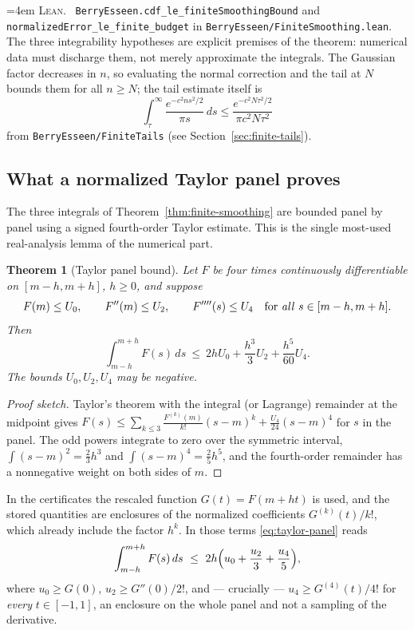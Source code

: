 \documentclass[10pt,a4paper]{article}
\theoremstyle{plain}
\newtheorem{theorem}{Theorem}[section]
\theoremstyle{definition}
\newcommand{\lean}[1]{\texttt{#1}}
\newcommand{\file}[1]{\texttt{#1}}
\newenvironment{leanref}%
  {\par\addvspace{3pt}\begingroup\sloppy\emergencystretch=4em
   \noindent\footnotesize\textsc{Lean.}\ \ignorespaces}%
  {\par\endgroup\addvspace{3pt}}
\begin{document}
\begin{leanref}
\lean{BerryEsseen.cdf\_le\_finiteSmoothingBound} and
\lean{normalizedError\_le\_finite\_budget} in
\file{BerryEsseen/FiniteSmoothing.lean}. The three integrability hypotheses are
explicit premises of the theorem: numerical data must discharge them, not merely
approximate the integrals. The Gaussian factor decreases in $n$, so evaluating
the normal correction and the tail at $N$ bounds them for all $n\ge N$; the
tail estimate itself is
\[
  \int_\tau^\infty\frac{e^{-c^2ns^2/2}}{\pi s}\,ds
  \le \frac{e^{-c^2N\tau^2/2}}{\pi c^2N\tau^2}
\]
from \file{BerryEsseen/FiniteTails} (see Section~\ref{sec:finite-tails}).
\end{leanref}

\subsection{What a normalized Taylor panel proves}
\label{sec:taylor-panel}

The three integrals of Theorem~\ref{thm:finite-smoothing} are bounded panel by
panel using a signed fourth-order Taylor estimate. This is the single most-used
real-analysis lemma of the numerical part.

\begin{theorem}[Taylor panel bound]\label{thm:taylor-panel}
Let $F$ be four times continuously differentiable on $[m-h,m+h]$, $h\ge0$, and
suppose
\[
  F(m)\le U_0, \qquad F''(m)\le U_2, \qquad
  F''''(s)\le U_4 \quad\text{for \emph{all} } s\in[m-h,m+h].
\]
Then
\begin{equation}\label{eq:taylor-panel}
  \int_{m-h}^{m+h}F(s)\,ds \ \le\ 2hU_0+\frac{h^3}{3}U_2+\frac{h^5}{60}U_4 .
\end{equation}
The bounds $U_0,U_2,U_4$ may be negative.
\end{theorem}

\begin{proof}[Proof sketch]
Taylor's theorem with the integral (or Lagrange) remainder at the midpoint
gives $F(s)\le\sum_{k\le3}\frac{F^{(k)}(m)}{k!}(s-m)^k+\frac{U_4}{24}(s-m)^4$
for $s$ in the panel. The odd powers integrate to zero over the symmetric
interval, $\int(s-m)^2=\tfrac23h^3$ and $\int(s-m)^4=\tfrac25h^5$, and the
fourth-order remainder has a nonnegative weight on both sides of $m$.
\end{proof}

In the certificates the rescaled function $G(t)=F(m+ht)$ is used, and the
stored quantities are enclosures of the normalized coefficients
$G^{(k)}(t)/k!$, which already include the factor $h^k$. In those terms
\eqref{eq:taylor-panel} reads
\begin{equation}\label{eq:taylor-normalized}
  \int_{m-h}^{m+h}F(s)\,ds \ \le\ 2h\Bigl(u_0+\frac{u_2}{3}+\frac{u_4}{5}\Bigr),
\end{equation}
where $u_0\ge G(0)$, $u_2\ge G''(0)/2!$, and --- crucially ---
$u_4\ge G^{(4)}(t)/4!$ for \emph{every} $t\in[-1,1]$, an enclosure on the whole
panel and not a sampling of the derivative.
\end{document}
